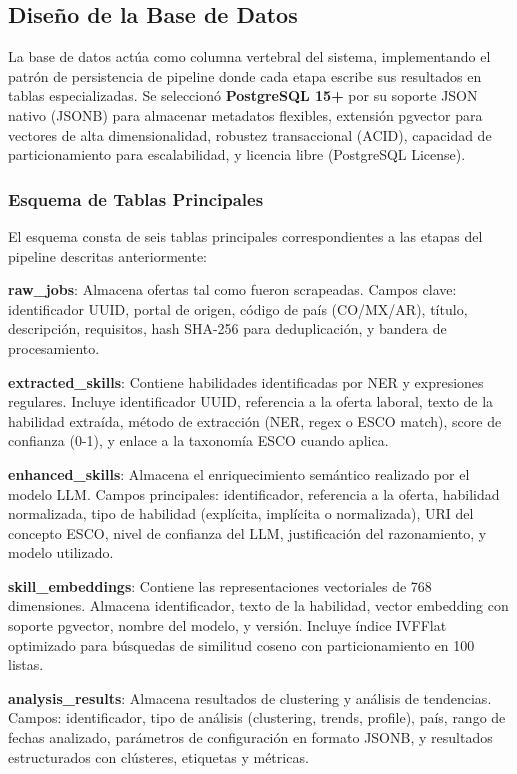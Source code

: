 \subsection{Diseño de la Base de Datos}

La base de datos actúa como columna vertebral del sistema, implementando el patrón de persistencia de pipeline donde cada etapa escribe sus resultados en tablas especializadas. Se seleccionó \textbf{PostgreSQL 15+} por su soporte JSON nativo (JSONB) para almacenar metadatos flexibles, extensión pgvector para vectores de alta dimensionalidad, robustez transaccional (ACID), capacidad de particionamiento para escalabilidad, y licencia libre (PostgreSQL License).

\subsubsection{Esquema de Tablas Principales}

El esquema consta de seis tablas principales correspondientes a las etapas del pipeline descritas anteriormente:

\textbf{raw\_jobs}: Almacena ofertas tal como fueron scrapeadas. Campos clave: identificador UUID, portal de origen, código de país (CO/MX/AR), título, descripción, requisitos, hash SHA-256 para deduplicación, y bandera de procesamiento.

\textbf{extracted\_skills}: Contiene habilidades identificadas por NER y expresiones regulares. Incluye identificador UUID, referencia a la oferta laboral, texto de la habilidad extraída, método de extracción (NER, regex o ESCO match), score de confianza (0-1), y enlace a la taxonomía ESCO cuando aplica.

\textbf{enhanced\_skills}: Almacena el enriquecimiento semántico realizado por el modelo LLM. Campos principales: identificador, referencia a la oferta, habilidad normalizada, tipo de habilidad (explícita, implícita o normalizada), URI del concepto ESCO, nivel de confianza del LLM, justificación del razonamiento, y modelo utilizado.

\textbf{skill\_embeddings}: Contiene las representaciones vectoriales de 768 dimensiones. Almacena identificador, texto de la habilidad, vector embedding con soporte pgvector, nombre del modelo, y versión. Incluye índice IVFFlat optimizado para búsquedas de similitud coseno con particionamiento en 100 listas.

\textbf{analysis\_results}: Almacena resultados de clustering y análisis de tendencias. Campos: identificador, tipo de análisis (clustering, trends, profile), país, rango de fechas analizado, parámetros de configuración en formato JSONB, y resultados estructurados con clústeres, etiquetas y métricas.

